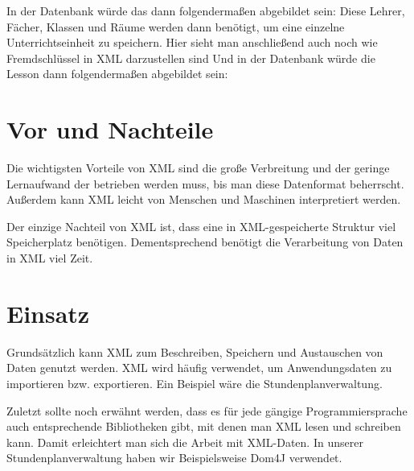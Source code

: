 In der Datenbank würde das dann folgendermaßen abgebildet sein:
Diese Lehrer, Fächer, Klassen und Räume werden dann benötigt, um eine einzelne Unterrichtseinheit zu speichern. Hier sieht man anschließend auch noch wie Fremdschlüssel in XML darzustellen sind
Und in der Datenbank würde die Lesson dann folgendermaßen abgebildet sein:

\section{Vor und Nachteile}

Die wichtigsten Vorteile von XML sind die große Verbreitung und der geringe Lernaufwand der betrieben werden muss, bis man diese Datenformat beherrscht. Außerdem kann XML leicht von Menschen und Maschinen interpretiert werden.

Der einzige Nachteil von XML ist, dass eine in XML-gespeicherte Struktur viel Speicherplatz benötigen. Dementsprechend benötigt die Verarbeitung von Daten in XML viel Zeit.

\section{Einsatz}

Grundsätzlich kann XML zum Beschreiben, Speichern und Austauschen von Daten genutzt werden.
XML wird häufig verwendet, um Anwendungsdaten zu importieren bzw. exportieren. Ein Beispiel wäre die Stundenplanverwaltung.

Zuletzt sollte noch erwähnt werden, dass es für jede gängige Programmiersprache auch entsprechende Bibliotheken gibt, mit denen man XML lesen und schreiben kann. Damit erleichtert man sich die Arbeit mit XML-Daten. In unserer Stundenplanverwaltung haben wir Beispielsweise Dom4J verwendet.